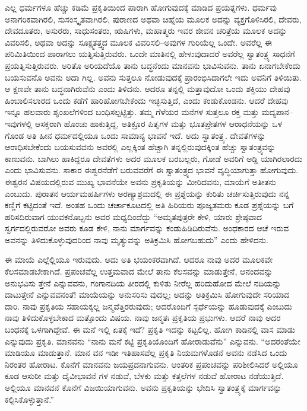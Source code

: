 ಎಲ್ಲ ಧರ್ಮಗಳೂ ಹೆಚ್ಚು ಕಡಿಮೆ ಪ್ರಕೃತಿಯಿಂದ ಪಾರಾಗಿ ಹೋಗುವುದಕ್ಕೆ ಮಾಡಿದ ಪ್ರಯತ್ನಗಳು. ಧರ್ಮವು ಅನಾಗರಿಕವಾಗಿರಲಿ, ಸುಸಂಸ್ಕೃತವಾಗಿರಲಿ, ಪುರಾಣದ ಅಥವಾ ಚಿಹ್ನೆಯ ಮೂಲಕ ಅದನ್ನು ವ್ಯಕ್ತಗೊಳಿಸಿರಲಿ, ದೇವರು, ದೇವದೂತರು, ಅಸುರರು, ಸಾಧುಸಂತರು, ಋಷಿಗಳು, ಮಹಾತ್ಮರು ಇವರ ಜೀವನ ಚರಿತ್ರೆಯ ಮೂಲಕ ಅದನ್ನು ವಿವರಿಸಲಿ, ಅಥವಾ ಅದನ್ನು ಸೂಕ್ಷ್ಮತತ್ತ್ವದ ಮೂಲಕ ವಿವರಿಸಲಿ–ಅವುಗಳ ಗುರಿಯೆಲ್ಲ ಒಂದೇ. ಅವರೆಲ್ಲ ಈ ಪರಿಮಿತಿಯಿಂದ ಪಾರಾಗಲು ಯತ್ನಿಸುತ್ತಿರುವರು. ಒಂದೇ ಮಾತಿನಲ್ಲಿ ಹೇಳುವುದಾದರೆ ಅವರೆಲ್ಲ ಸ್ವಾತಂತ್ರ್ಯ ಸಾಧನೆಗೆ ಪ್ರಯತ್ನಿಸುತ್ತಿರುವರು. ಅರಿತೊ ಅರಿಯದೆಯೊ ತಾನು ಬದ್ಧನೆಂದು ಮಾನವನು ಭಾವಿಸುವನು. ತಾನು ಏನಾಗಬೇಕೆಂದು ಬಯಸುವನೊ ಅವನು ಅದಾ ಗಿಲ್ಲ. ಅವನು ಸುತ್ತಲೂ ನೋಡುವುದಕ್ಕೆ ಪ್ರಾರಂಭಿಸಿದಾಗಲೇ ಇದು ಅವನಿಗೆ ತಿಳಿಯಿತು. ಆ ಕ್ಷಣವೇ ತಾನು ಬದ್ಧನಾಗಿರುವೆನು ಎಂದು ತಿಳಿದನು. ಆದರೂ ತನ್ನಲ್ಲಿ ಮತ್ತಾವುದೋ ಒಂದು ಶಕ್ತಿಯು ದೇಹವು ಹಿಂಬಾಲಿಸಲಾರದ ಒಂದು ಕಡೆಗೆ ಹಾರಿಹೋಗಬೇಕೆಂದು ಇಚ್ಛಿಸುತ್ತಿದೆ, ಎಂದು ಕಂಡುಕೊಂಡನು. ಆದರೆ ದೇಹವು ಇನ್ನೂ ಹಲವಾರು ಶೃಂಖಲೆಗಳಿಂದ ಬಂಧಿಸಲ್ಪಟ್ಟಿತ್ತು. ತಮ್ಮ ಗೆಳೆಯರ ಮನೆಗಳ ಸುತ್ತಲೂ ರಕ್ತ ಮತ್ತು ಮದ್ಯಪಾನ–ಇವುಗಳಲ್ಲಿ ಆಸಕ್ತರಾಗಿ ಹೊಂಚು ಹಾಕುತ್ತಿದ್ದ, ಅತಿಕ್ರೂರ ಪಿತೃಗಳ ಮತ್ತು ಭೂತಪ್ರೇತಗಳ ಆರಾಧನೆಯನ್ನು ಒಳ ಗೊಂಡ ಅತಿ ಹೀನ ಧರ್ಮದಲ್ಲಿಯೂ ಒಂದು ಸಾಮಾನ್ಯ ಭಾವನೆ ಇದೆ. ಅದು ಸ್ವಾತಂತ್ರ್ಯ. ದೇವತೆಗಳನ್ನು ಆರಾಧಿಸಬೇಕೆಂದು ಬಯಸುವವನು ಅವರಲ್ಲಿ ಎಲ್ಲಕ್ಕಿಂತ ಹೆಚ್ಚಾಗಿ ತನ್ನಲ್ಲಿರುವುದಕ್ಕಿಂತ ಹೆಚ್ಚು ಸ್ವಾತಂತ್ರ್ಯವನ್ನು ಕಾಣುವನು. ಬಾಗಿಲು ಹಾಕಿದ್ದರೂ ದೇವತೆಗಳು ಅದರ ಮೂಲಕ ಬರಬಲ್ಲರು, ಗೋಡೆ ಅವರಿಗೆ ಅಡ್ಡಿ ಯಾಗಿರಲಾರದು ಎಂದು ಭಾವಿಸುವನು. ಸಾಕಾರ ಈಶ್ವರನೆಡೆಗೆ ಬರುವವರೆಗೆ ಈ ಸ್ವಾತಂತ್ರ್ಯದ ಭಾವನೆ ವೃದ್ಧಿಯಾಗುತ್ತಾ ಹೋಗುವುದು. ಈಶ್ವರನ ವಿಷಯದಲ್ಲಿರುವ ಮುಖ್ಯ ಭಾವನೆಯೇ ಅವನು ಪ್ರಕೃತಿಯನ್ನು ಮೀರಿದವನು, ಮಾಯೆಗೆ ಅತೀತನು ಎಂಬುದು. ಪುರಾತನ ಆರ್ಯಮಹರ್ಷಿಗಳು ಅರಣ್ಯಾಶ್ರಮದಲ್ಲಿ ಈ ಪ್ರಶ್ನೆಯನ್ನು ಕುರಿತು ಚರ್ಚಿಸುತ್ತಿರುವುದು ನನ್ನ ಕಣ್ಣಿಗೆ ಕಟ್ಟಿದಂತೆ ಇದೆ. ಅಂತಹ ಒಂದು ಚರ್ಚಾಕೂಟದಲ್ಲಿ ಅತಿ ಹಿರಿಯರು ಪೂಜ್ಯತಮರು ಕೂಡ ಪ್ರಶ್ನೆಯನ್ನು ಬಗೆ ಹರಿಸದಿರುವಾಗ ಯುವಕನೊಬ್ಬನು ಅವರ ಮಧ್ಯದಿಂದೆದ್ದು “ಅಮೃತಪುತ್ರರೇ ಕೇಳಿ, ಯಾರು ಶ್ರೇಷ್ಠವಾದ ಸ್ವರ್ಗದಲ್ಲಿರುವರೋ ಅವರು ಕೂಡ ಕೇಳಿ, ನಾನು ಮಾರ್ಗವನ್ನು ಕಂಡುಹಿಡಿದಿರುವೆನು. ಅಂಧಕಾರದ ಆಚೆ ಇರುವ ಅವನನ್ನು ತಿಳಿದುಕೊಳ್ಳುವುದರಿಂದ ನಾವು ಮೃತ್ಯುವನ್ನು ಅತಿಕ್ರಮಿಸಿ ಹೋಗಬಹುದು” ಎಂದು ಹೇಳಿದನು.

ಈ ಮಾಯೆ ಎಲ್ಲೆಲ್ಲಿಯೂ ಇರುವುದು. ಅದು ಅತಿ ಭಯಂಕರವಾಗಿದೆ. ಆದರೂ ನಾವು ಅದರ ಮೂಲಕವೇ ಕೆಲಸಮಾಡಬೇಕಾಗಿದೆ. ಪ್ರಪಂಚವೆಲ್ಲ ಉತ್ತಮವಾದ ಮೇಲೆ ತಾನು ಕೆಲಸವನ್ನು ಮಾಡುತ್ತೇನೆ, ಆನಂದವನ್ನು ಅನುಭವಿಸು ತ್ತೇನೆ ಎನ್ನುವವನು, ಗಂಗಾನದಿಯ ತೀರದಲ್ಲಿ ಕುಳಿತು ನೀರೆಲ್ಲ ಹರಿದುಹೋದ ಮೇಲೆ ನದಿಯನ್ನು ದಾಟುತ್ತೇನೆ ಎನ್ನುವವನಂತೆ! ಮಾಯೆಯನ್ನು ಅನುಸರಿಸು ವುದಲ್ಲ; ಅದನ್ನು ಅತಿಕ್ರಮಿಸಿ ಹೋಗುವುದೇ ಸರಿಯಾದ ದಾರಿ. ನಾವು ಪ್ರಕೃತಿಯ ಸಹಾಯಕ್ಕಲ್ಲ ಜನ್ಮವೆತ್ತಿರರುವುದು; ಅದರೊಂದಿಗೆ ಸ್ಪರ್ಧೆಯನ್ನು ಹೂಡುವುದಕ್ಕೆ ಎಂಬುದು ನಾವು ತಿಳಿದುಕೊಳ್ಳಬೇಕಾದ ಮತ್ತೊಂದು ವಿಷಯ. ನಾವು ಜನ್ಮತಃ ಪ್ರಕೃತಿಯ ಪ್ರಭುಗಳು. ಆದರೆ ನಾವು ಅದರ ಬಂಧನಕ್ಕೆ ಒಳಗಾಗಿದ್ದೇವೆ. ಈ ಮನೆ ಇಲ್ಲಿ ಏತಕ್ಕೆ ಇದೆ? ಪ್ರಕೃತಿ ಇದನ್ನು ಕಟ್ಟಲಿಲ್ಲ. ಹೋಗಿ ಕಾಡಿನಲ್ಲಿ ವಾಸ ಮಾಡು ಎನ್ನುವುದು ಪ್ರಕೃತಿ. ಮಾನವನು “ನಾನು ಮನೆ ಕಟ್ಟಿ ಪ್ರಕೃತಿಯೊಂದಿಗೆ ಹೋರಾಡುವೆನು” ಎನ್ನುವನು. “ಅದರಂತೆಯೇ ಮಾಡಿಯೂ ಮಾಡುತ್ತಾನೆ. ಮಾನ ವನ ಇಡೀ ಇತಿಹಾಸವೆಲ್ಲ ಪ್ರಕೃತಿ ನಿಯಮಗಳೊಡನೆ ಅವನು ನಡೆಸಿದ ಒಂದು ನಿರಂತರ ಹೋರಾಟ. ಕೊನೆಗೆ ಮಾನವನು ಜಯಪ್ರದನಾಗುವನು. ಆಂತರಿಕ ಪ್ರಪಂಚವನ್ನು ಪರಿಶೀಲಿಸಿದರೆ ಅಲ್ಲಿಯೂ ಕೂಡ ಆಸುರೀ ಮತ್ತು ದೈವೀಭಾವನೆ ಗಳ ನಡುವೆ, ಬೆಳಕು ಮತ್ತು ಕತ್ತಲೆಗಳ ನಡುವೆ ಹೋರಾಟ ನಡೆಯುತ್ತಿದೆ. ಅಲ್ಲಿಯೂ ಮಾನವನೆ ಕೊನೆಗೆ ವಿಜಯಿಯಾಗುವನು. ಅವನು ಪ್ರಕೃತಿಯನ್ನು ಭೇದಿಸಿ ಸ್ವಾತಂತ್ರ್ಯಕ್ಕೆ ಮಾರ್ಗವನ್ನು ಕಲ್ಪಿಸಿಕೊಳ್ಳುತ್ತಾನೆ.”

